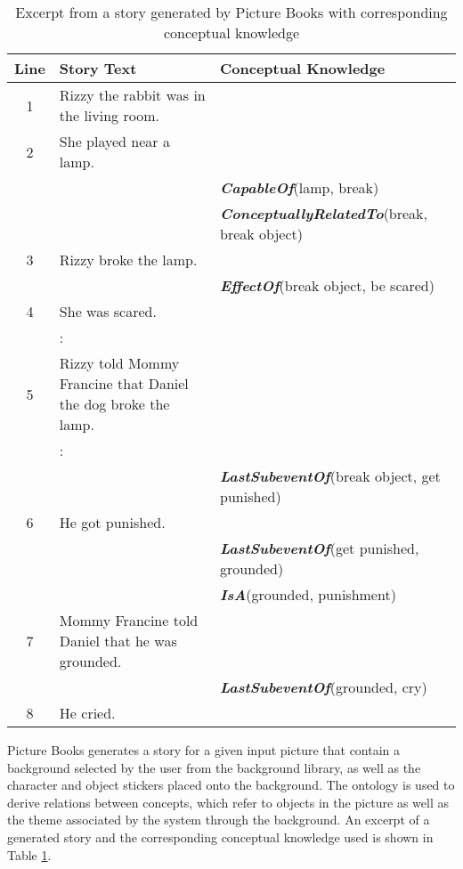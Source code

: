 \begin{table}[h]   %
\centering
\caption{Excerpt from a story generated by Picture Books with corresponding conceptual knowledge} \vspace{0.25em}
\begin{tabular}{|c|p{6.5cm}|p{6cm}|} \hline
Line & Story Text & Conceptual Knowledge \\ \hline
1 & Rizzy the rabbit was in the living room. & \\
2 & She played near a lamp. & \\
  &  & \textbf{\emph{CapableOf}}(lamp, break) \\
  &  & \textbf{\emph{ConceptuallyRelatedTo}}(break, break object) \\
3 & Rizzy broke the lamp. & \\
  &  & \textbf{\emph{EffectOf}}(break object, be scared) \\
4 & She was scared. & \\
  & : & \\
5 & Rizzy told Mommy Francine that Daniel the dog broke the lamp. & \\
  & : & \\
  &  & \textbf{\emph{LastSubeventOf}}(break object, get punished) \\
6 & He got punished. & \\
  &  & \textbf{\emph{LastSubeventOf}}(get punished, grounded) \\
  &  & \textbf{\emph{IsA}}(grounded, punishment) \\
7 & Mommy Francine told Daniel that he was grounded. & \\
  &  & \textbf{\emph{LastSubeventOf}}(grounded, cry) \\
8 & He cried. & \\ \hline
\end{tabular}
\label{tab:picturebookexcerpt}
\end{table}

Picture Books generates a story for a given input picture that contain a background selected by the user from the background library, as well as the character and object stickers placed onto the background. The ontology is used to derive relations between concepts, which refer to objects in the picture as well as the theme associated by the system through the background. An excerpt of a generated story and the corresponding conceptual knowledge used is shown in Table \ref{tab:picturebookexcerpt}.

